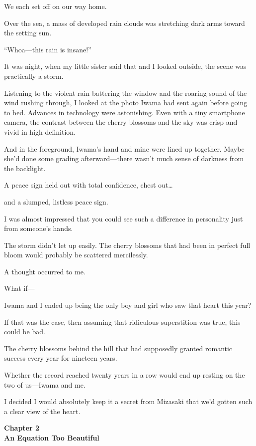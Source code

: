\documentclass[
    a4paper,
    12pt,
    twoside,
    openany,
    UTF8,
    fontset=windows
]{ctexbook}
\begin{document}
We each set off on our way home.

Over the sea, a mass of developed rain clouds was stretching dark arms toward the setting sun.

``Whoa---this rain is insane!''

It was night, when my little sister said that and I looked outside, the scene was practically a storm.

Listening to the violent rain battering the window and the roaring sound of the wind rushing through, I looked at the photo Iwama had sent again before going to bed. Advances in technology were astonishing. Even with a tiny smartphone camera, the contrast between the cherry blossoms and the sky was crisp and vivid in high definition.

And in the foreground, Iwama's hand and mine were lined up together. Maybe she'd done some grading afterward---there wasn't much sense of darkness from the backlight.

A peace sign held out with total confidence, chest out\dots\

and a slumped, listless peace sign.

I was almost impressed that you could see such a difference in personality just from someone's hands.

The storm didn't let up easily. The cherry blossoms that had been in perfect full bloom would probably be scattered mercilessly.

A thought occurred to me.

What if---

Iwama and I ended up being the only boy and girl who saw that heart this year?

If that was the case, then assuming that ridiculous superstition was true, this could be bad.

The cherry blossoms behind the hill that had supposedly granted romantic success every year for nineteen years.

Whether the record reached twenty years in a row would end up resting on the two of us---Iwama and me.

I decided I would absolutely keep it a secret from Mizasaki that we'd gotten such a clear view of the heart.

\clearpage
\thispagestyle{plain}
\begin{center}
    \large\bfseries
    Chapter 2\\
    An Equation Too Beautiful
\end{center}
\label{sec:ch2}
\vspace{1cm}
\end{document}
